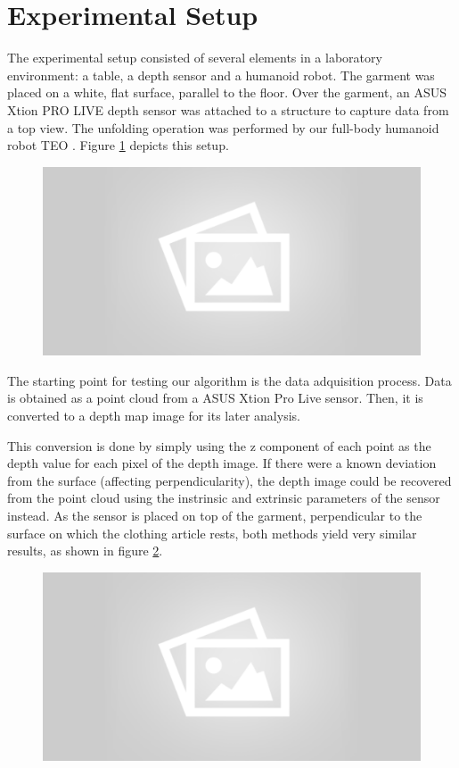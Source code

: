 \section{Experimental Setup}
\label{experiments:expermimental_setup}

The experimental setup consisted of several elements in a laboratory environment: a table, a depth sensor and a humanoid robot. The garment was placed on a white, flat surface, parallel to the floor. Over the garment, an ASUS Xtion PRO LIVE depth sensor was attached to a structure to capture data from a top view. The unfolding operation was performed by our full-body humanoid robot TEO \cite{martinez2012teo}. Figure \ref{fig:experimental_setup} depicts this setup.

\begin{figure}[thpb]
    \centering
    \includegraphics[width=0.7
    \textwidth]{figures/placeholder2.png}
    \caption{}
    \label{fig:experimental_setup}
\end{figure}

The starting point for testing our algorithm is the data adquisition process. Data is obtained as a point cloud from a ASUS Xtion Pro Live sensor. Then, it is converted to a depth map image for its later analysis. 

This conversion is done by simply using the z component of each point as the depth value for each pixel of the depth image. If there were a known deviation from the surface (affecting perpendicularity), the depth image could be recovered from the point cloud using the instrinsic and extrinsic parameters of the sensor instead. As the sensor is placed on top of the garment, perpendicular to the surface on which the clothing article rests, both methods yield very similar results, as shown in figure \ref{fig:point_cloud_and_depth_image}.

\begin{figure}[thpb]
    \centering
    \includegraphics[width=0.7
    \textwidth]{figures/placeholder2.png}
    \caption{}
    \label{fig:point_cloud_and_depth_image}
\end{figure}

